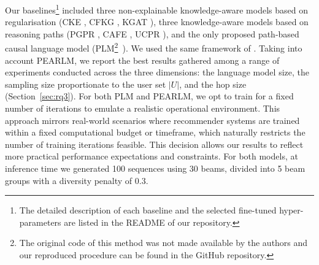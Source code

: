 \documentclass[sigconf]{acmart}
\begin{document}
 Our baselines\footnote{The detailed description of each baseline and the selected fine-tuned
hyper-parameters are listed in the README of our repository.}
included three non-explainable knowledge-aware models based on regularisation (CKE \cite{CKE10.1145/2939672.2939673}, CFKG \cite{AiACZ18}, KGAT \cite{Wang00LC19}), three knowledge-aware models based on reasoning paths (PGPR \cite{10.1145/3331184.3331203}, CAFE \cite{10.1145/3340531.3412038}, UCPR \cite{usercentric}), and the only proposed path-based causal language model (PLM\footnote{The original code of this method was not made available by the authors and our reproduced procedure can be found in the GitHub repository.}~\cite{10.1145/3485447.3511937}). We used the same framework of \cite{10.1007/978-3-031-28241-6_1}. Taking into account PEARLM, we report the best results gathered among a range of experiments conducted across the three dimensions: the language model size, the sampling size proportionate to the user set $|U|$, and the hop size (Section~\ref{sec:rq3}). For both PLM and PEARLM, we opt to train for a fixed number of iterations to emulate a realistic operational environment. This approach mirrors real-world scenarios where recommender systems are trained within a fixed computational budget or timeframe, which naturally restricts the number of training iterations feasible. This decision allows our results to reflect more practical performance expectations and constraints. For both models, at inference time we generated 100 sequences using 30 beams, divided into 5 beam groups with a diversity penalty of 0.3.
\end{document}
